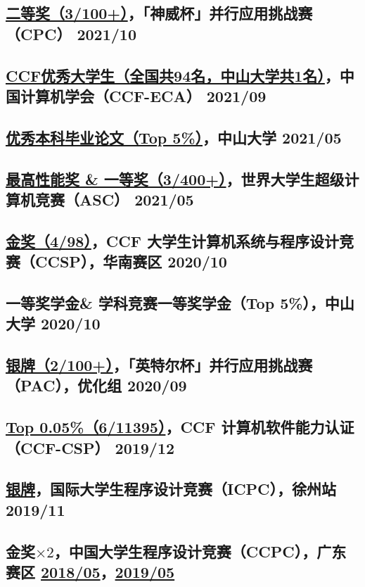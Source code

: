 \documentclass[
    scheme=plain
]{ctexart}
\newcommand{\datedsubsection}[2]{%
\subsection[#1]{#1 \hfill #2}
}
\begin{document}
\datedsubsection{\href{https://mp.weixin.qq.com/s/GQsaR_V1NoGzCvbGARMeEA}{二等奖（3/100+）}，「神威杯」并行应用挑战赛（CPC）}{2021/10}
\datedsubsection{\href{https://mp.weixin.qq.com/s/AJKqG2KvLl6n_88_8IzsYw}{CCF优秀大学生（全国共94名，中山大学共1名）}，中国计算机学会（CCF-ECA）}{2021/09}
\datedsubsection{\href{https://wu-kan.cn/2021/03/14/HPL-AI/}{优秀本科毕业论文（Top 5\%）}，中山大学}{2021/05}
\datedsubsection{\href{https://wu-kan.cn/2021/05/19/\%E6\%88\%91\%E7\%9A\%84ASC\%E5\%86\%B3\%E8\%B5\%9B\%E5\%A4\%8D\%E7\%9B\%98-\%E5\%86\%92\%E9\%99\%A9-\%E5\%A4\%B1\%E8\%AF\%AF\%E4\%B8\%8E\%E7\%BF\%BB\%E8\%BD\%A6/}{最高性能奖 \& 一等奖（3/400+）}，世界大学生超级计算机竞赛（ASC）}{2021/05}
\datedsubsection{\href{https://wu-kan.cn/2020/10/17/2020-CCF-CCSP\%E7\%AB\%9E\%E8\%B5\%9B-\%E5\%90\%AB\%E5\%88\%86\%E8\%B5\%9B\%E5\%8C\%BA\%E7\%AB\%9E\%E8\%B5\%9B/}{金奖（4/98）}，CCF 大学生计算机系统与程序设计竞赛（CCSP），华南赛区}{2020/10}
\datedsubsection{一等奖学金\& 学科竞赛一等奖学金（Top 5\%），中山大学}{2020/10}
\datedsubsection{\href{https://mp.weixin.qq.com/s/ahnG7gJLBu9CMCYjk1_CkQ}{银牌（2/100+）}，「英特尔杯」并行应用挑战赛（PAC），优化组}{2020/09}
\datedsubsection{\href{https://wu-kan.cn/2019/12/16/\%E7\%AC\%AC\%E5\%8D\%81\%E5\%85\%AB\%E6\%AC\%A1CCF\%E8\%AE\%A1\%E7\%AE\%97\%E6\%9C\%BA\%E8\%BD\%AF\%E4\%BB\%B6\%E8\%83\%BD\%E5\%8A\%9B\%E8\%AE\%A4\%E8\%AF\%81/}{Top 0.05\%（6/11395）}，CCF 计算机软件能力认证（CCF-CSP）}{2019/12}
\datedsubsection{\href{https://wu-kan.cn/2019/11/04/\%E5\%86\%8D\%E8\%A7\%81-\%E7\%AE\%97\%E6\%B3\%95\%E7\%AB\%9E\%E8\%B5\%9B/}{银牌}，国际大学生程序设计竞赛（ICPC），徐州站}{2019/11}
\datedsubsection{金奖$\times 2$，中国大学生程序设计竞赛（CCPC），广东赛区}{{\href{https://ccpc.io/post/110}{2018/05}，\href{http://www.gdcpc.cn/ArticleView/ArticleDetail?articleId=5cda35a3659ce607a808929a}{2019/05}}}
\end{document}
